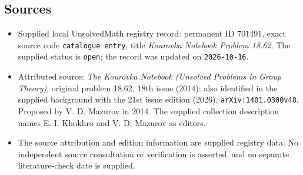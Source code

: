 \documentclass[11pt]{article}
\begin{document}
\subsection{Sources}
\begin{itemize}
\item Supplied local UnsolvedMath registry record: permanent ID \(701491\), exact source code \texttt{catalogue entry}, title \emph{Kourovka Notebook Problem 18.62}. The supplied status is \texttt{open}; the record was updated on \texttt{2026-10-16}.
\item Attributed source: \emph{The Kourovka Notebook (Unsolved Problems in Group Theory)}, original problem 18.62, 18th issue (2014); also identified in the supplied background with the 21st issue edition (2026), \texttt{arXiv:1401.0300v48}. Proposed by V. D. Mazurov in 2014. The supplied collection description names E. I. Khukhro and V. D. Mazurov as editors.
\item The source attribution and edition information are supplied registry data. No independent source consultation or verification is asserted, and no separate literature-check date is supplied.
\end{itemize}
\end{document}
